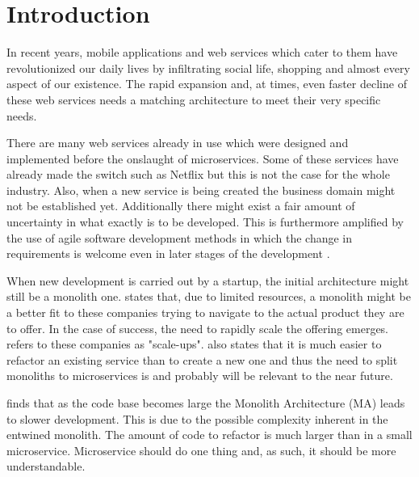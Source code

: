 

\section{Introduction}
\begin{sloppypar}
    In recent years, mobile applications and web services which cater to them
    have revolutionized our daily lives by infiltrating social life, shopping
    and almost every aspect of our existence. The rapid expansion and, at times,
    even faster decline of these web services needs a matching architecture to
    meet their very specific needs.
\end{sloppypar}
\begin{sloppypar}
    There are many web services already in use which were designed and
    implemented before the onslaught of microservices. Some of these services
    have already made the switch such as Netflix but this is not the case for
    the whole industry. Also, when a new service is being created the business
    domain might not be established yet. Additionally there might exist a fair
    amount of uncertainty in what exactly is to be developed. This is
    furthermore amplified by the use of agile software development methods in
    which the change in requirements is welcome even in later stages of the
    development \citep{agilemanifesto}.
\end{sloppypar}
\begin{sloppypar}
    When new development is carried out by a startup, the initial architecture
    might still be a monolith one. \citet{newman2019} states that, due to
    limited resources, a monolith might be a better fit to these companies
    trying to navigate to the actual product they are to offer. In the case of
    success, the need to rapidly scale the offering emerges. \citet{newman2019}
    refers to these companies as "scale-ups". \citet{newman2019} also states
    that it is much easier to refactor an existing service than to create a new
    one and thus the need to split monoliths to microservices is and probably
    will be relevant to the near future.
\end{sloppypar}
\begin{sloppypar}
    \citet{10.1007/978-3-319-74433-9_3} finds that as the code base becomes
    large the Monolith Architecture (MA) leads to slower development. This is
    due to the possible complexity inherent in the entwined monolith. The amount
    of code to refactor is much larger than in a small microservice.
    Microservice should do one thing and, as such, it should be more
    understandable.
\end{sloppypar}
